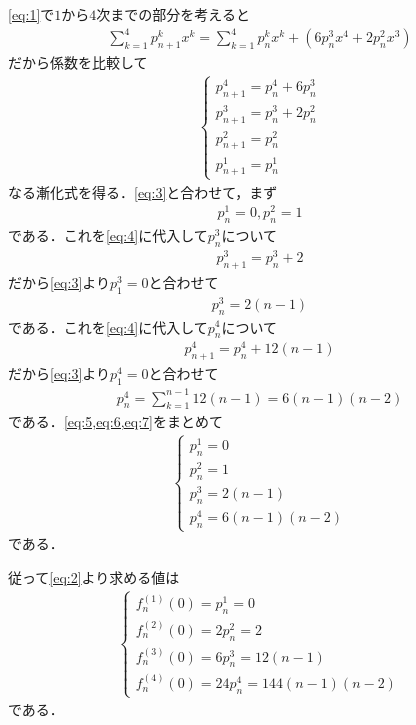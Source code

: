 \documentclass[../../main.tex]{subfiles}
\begin{document}
\cref{eq:1}で$1$から$4$次までの部分を考えると
\begin{align}
  \sum_{k=1}^{4}p^{k}_{n+1}x^{k} = \sum_{k=1}^{4}p^{k}_{n}x^{k} + \left(6p^{3}_{n}x^4+2p^{2}_{n}x^3\right)
\end{align}
だから係数を比較して
\begin{align}
  \begin{cases}
    p^{4}_{n+1} = p^{4}_{n} + 6p^{3}_{n} \\
    p^{3}_{n+1} = p^{3}_{n} + 2p^{2}_{n} \\
    p^{2}_{n+1} = p^{2}_{n} \\
    p^{1}_{n+1} = p^{1}_{n}
  \end{cases} \label{eq:4}
\end{align}
なる漸化式を得る．\cref{eq:3}と合わせて，まず
\begin{align}
  p^{1}_{n} = 0, p^{2}_{n} = 1 \label{eq:5}
\end{align}
である．これを\cref{eq:4}に代入して$p^{3}_{n}$について
\begin{align}
  p^{3}_{n+1} = p^{3}_{n} + 2
\end{align}
だから\cref{eq:3}より$p^{3}_{1}=0$と合わせて
\begin{align}
  p^{3}_{n} = 2(n-1) \label{eq:6}
\end{align}
である．これを\cref{eq:4}に代入して$p^{4}_{n}$について
\begin{align}
  p^{4}_{n+1} = p^{4}_{n} + 12(n-1)
\end{align}
だから\cref{eq:3}より$p^{4}_{1}=0$と合わせて
\begin{align}
  p^{4}_{n} = \sum_{k=1}^{n-1} 12(n-1) = 6(n-1)(n-2) \label{eq:7}
\end{align}
である．\cref{eq:5,eq:6,eq:7}をまとめて
\begin{align}
  \begin{cases}
    p^{1}_{n} = 0 \\
    p^{2}_{n} = 1 \\
    p^{3}_{n} = 2(n-1) \\
    p^{4}_{n} = 6(n-1)(n-2)
  \end{cases}
\end{align}
である．

従って\cref{eq:2}より求める値は
\begin{align}
  \begin{cases}
    f_n^{(1)}(0)=p^{1}_{n}=0 \\
    f_n^{(2)}(0)=2p^{2}_{n}=2 \\
    f_n^{(3)}(0)=6p^{3}_{n}=12(n-1) \\
    f_n^{(4)}(0)=24p^{4}_{n}=144(n-1)(n-2)
  \end{cases}
\end{align}
である．
\end{document}
